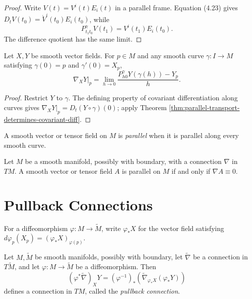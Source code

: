 \begin{proof}
\sketch Write $V(t)=V^i(t)E_i(t)$ in a parallel frame. Equation (4.23) gives
$D_tV(t_0)=\dot V^i(t_0)E_i(t_0)$, while
\[
P_{t_1t_0}^\gamma V(t_1)=V^i(t_1)E_i(t_0).
\]
The difference quotient has the same limit.
\end{proof}

\begin{corollary}
\label{cor:parallel-transport-determines-connection}
Let $X,Y$ be smooth vector fields. For $p\in M$ and any smooth curve
$\gamma\colon I\to M$ satisfying $\gamma(0)=p$ and $\gamma'(0)=X_p$,
\begin{equation}
\nabla_XY|_p=\lim_{h\to0}
\frac{P_{h0}^\gamma Y(\gamma(h))-Y_p}{h}. \tag{4.25}
\end{equation}
\end{corollary}

\begin{proof}
\sketch Restrict $Y$ to $\gamma$. The defining property of covariant
differentiation along curves gives $\nabla_XY|_p=D_t(Y\circ\gamma)(0)$; apply
Theorem \ref{thm:parallel-transport-determines-covariant-diff}.
\end{proof}

A smooth vector or tensor field on $M$ is \emph{parallel} when it is parallel
along every smooth curve.

\begin{proposition}
\label{prop:parallel-field-characterization}
Let $M$ be a smooth manifold, possibly with boundary, with a connection $\nabla$
in $TM$. A smooth vector or tensor field $A$ is parallel on $M$ if and only if
$\nabla A\equiv0$.
\end{proposition}

\section{Pullback Connections}

For a diffeomorphism $\varphi\colon M\to\widetilde M$, write $\varphi_*X$ for
the vector field satisfying
$d\varphi_p(X_p)=(\varphi_*X)_{\varphi(p)}$.

\begin{lemma}
\label{lem:pullback-connection}
\leanok
Let $M,\widetilde M$ be smooth manifolds, possibly with boundary, let
$\widetilde\nabla$ be a connection in $T\widetilde M$, and let
$\varphi\colon M\to\widetilde M$ be a diffeomorphism. Then
\begin{equation}
(\varphi^*\widetilde\nabla)_XY
=(\varphi^{-1})_*
\left(\widetilde\nabla_{\varphi_*X}(\varphi_*Y)\right) \tag{4.26}
\end{equation}
defines a connection in $TM$, called the \emph{pullback connection}.
\end{lemma}

